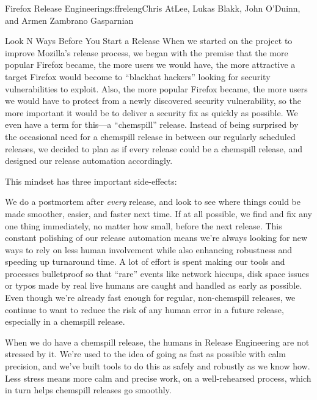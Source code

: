\begin{aosachapter}{Firefox Release Engineering}{s:ffreleng}{Chris AtLee, Lukas Blakk, John O'Duinn, and Armen Zambrano Gasparnian}
\begin{aosasect1}{Look N Ways Before You Start a Release}
When we started on the project to improve Mozilla's release process,
we began with the premise that the more popular Firefox became, the
more users we would have, the more attractive a target Firefox would
become to ``blackhat hackers'' looking for security vulnerabilities to
exploit. Also, the more popular Firefox became, the more users we
would have to protect from a newly discovered security vulnerability,
so the more important it would be to deliver a security fix as quickly
as possible. We even have a term for this---a ``chemspill''
release. Instead of being surprised by the occasional need for a
chemspill release in between our regularly scheduled releases, we
decided to plan as if every release could be a chemspill release, and
designed our release automation accordingly.

This mindset has three important side-effects:

\begin{aosaenumerate}

\item We do a postmortem after \emph{every} release, and look to see
  where things could be made smoother, easier, and faster next
  time. If at all possible, we find and fix any one thing immediately,
  no matter how small, before the next release. This constant
  polishing of our release automation means we're always looking for
  new ways to rely on less human involvement while also enhancing
  robustness and speeding up turnaround time. A lot of effort is spent
  making our tools and processes bulletproof so that ``rare'' events
  like network hiccups, disk space issues or typos made by real live
  humans are caught and handled as early as possible.  Even though
  we're already fast enough for regular, non-chemspill releases, we
  continue to want to reduce the risk of any human error in a future
  release, especially in a chemspill release.

\item When we do have a chemspill release, the humans in Release
  Engineering are not stressed by it. We're used to the idea of going
  as fast as possible with calm precision, and we've built tools to do
  this as safely and robustly as we know how. Less stress means more
  calm and precise work, on a well-rehearsed process, which in turn
  helps chemspill releases go smoothly.


\end{aosaenumerate}
\end{aosasect1}
\end{aosachapter}
